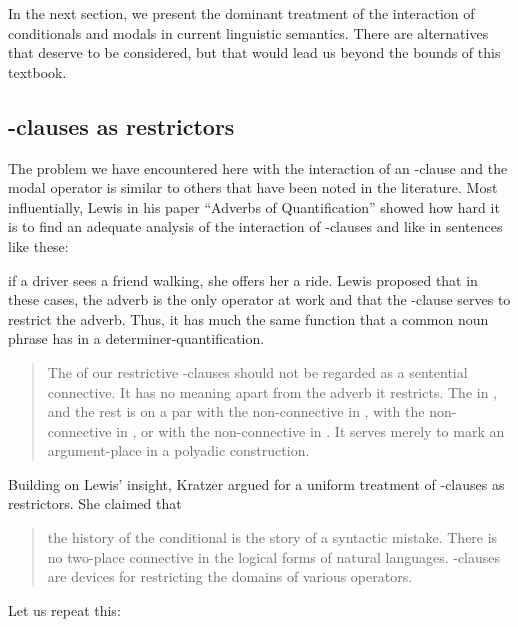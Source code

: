 In the next section, we present the dominant treatment of the interaction of
conditionals and modals in current linguistic semantics. There are alternatives
that deserve to be considered, but that would lead us beyond the bounds of this
textbook.

\subsection{-clauses as restrictors}

The problem we have encountered here with the interaction of an
-clause and the modal operator  is similar to
others that have been noted in the literature. Most influentially, Lewis in his
paper ``Adverbs of Quantification'' \parencite{lewis-1975-adverbs} showed how
hard it is to find an adequate analysis of the interaction of
-clauses and  like
 in sentences like
these:

\ex {} if a driver sees a
friend walking, she offers her a ride. \xe
%
Lewis proposed that in these cases, the adverb is the only operator at work and
that the -clause serves to restrict the adverb. Thus, it has much
the same function that a common noun phrase has in a determiner-quantification.

\begin{quote}
	
	The  of our restrictive -clauses should not be
  regarded as a sentential connective. It has no meaning apart from the adverb
  it restricts. The  in , and the rest is on a par with the
  non-connective  in ,
  with the non-connective  in , or with the non-connective  in . It serves merely to mark an
  argument-place in a polyadic construction. \parencite[11]{lewis-1975-adverbs}

\end{quote}
%
Building on Lewis' insight, Kratzer argued for a uniform treatment of
-clauses as restrictors. She claimed that

\begin{quote}
	
	the history of the conditional is the story of a syntactic mistake. There is
  no two-place  connective in the logical forms of
  natural languages. -clauses are devices for restricting the
  domains of various operators. \citep{kratzer-1986-conditionals}
\end{quote}
%
\kwn Let us repeat this:

